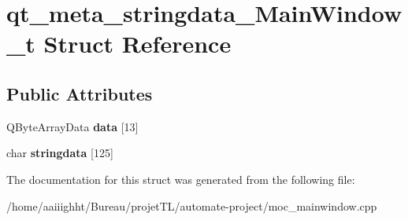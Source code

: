 \hypertarget{structqt__meta__stringdata___main_window__t}{\section{qt\-\_\-meta\-\_\-stringdata\-\_\-\-Main\-Window\-\_\-t Struct Reference}
\label{structqt__meta__stringdata___main_window__t}
}
\subsection*{Public Attributes}
\begin{DoxyCompactItemize}
\item 
\hypertarget{structqt__meta__stringdata___main_window__t_a3425efb15419da867ddd69f8a4ed9e67}{Q\-Byte\-Array\-Data {\bfseries data} \mbox{[}13\mbox{]}}\label{structqt__meta__stringdata___main_window__t_a3425efb15419da867ddd69f8a4ed9e67}

\item 
\hypertarget{structqt__meta__stringdata___main_window__t_a83a4e6119d3600df5ed2ecd99c255853}{char {\bfseries stringdata} \mbox{[}125\mbox{]}}\label{structqt__meta__stringdata___main_window__t_a83a4e6119d3600df5ed2ecd99c255853}

\end{DoxyCompactItemize}


The documentation for this struct was generated from the following file\-:\begin{DoxyCompactItemize}
\item 
/home/aaiiighht/\-Bureau/projet\-T\-L/automate-\/project/moc\-\_\-mainwindow.\-cpp\end{DoxyCompactItemize}
